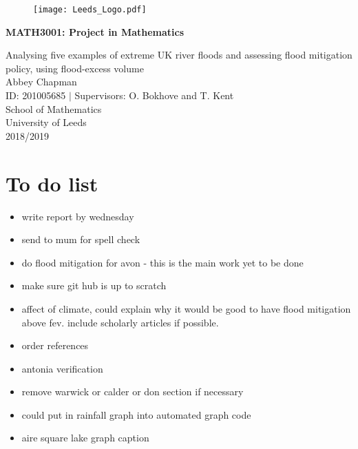 \documentclass[11pt,a4paper]{article}
\begin{document}

\begin{titlepage}
\begin{center}

\begin{figure}[t]
\raggedleft
\texttt{[image: Leeds\_Logo.pdf]}
\end{figure}
 

\vspace*{5cm}
{\huge \textbf{MATH3001: Project in Mathematics}}\\
\hrulefill

\vspace*{0.1cm}
{\LARGE Analysing five examples of extreme UK river floods and assessing flood mitigation policy, using flood-excess volume}\\
\vspace{1cm}
{\large Abbey Chapman}\\
{\large ID: 201005685 $|$ Supervisors: O. Bokhove and T. Kent}\\
\vfill
School of Mathematics\\
University of Leeds\\
2018/2019
\end{center}
\end{titlepage}

\tableofcontents 
\noindent \hrulefill

\newpage
\section{To do list}
\begin{itemize}
\item write report by wednesday
\item send to mum for spell check
\item do flood mitigation for avon - this is the main work yet to be done
\item make sure git hub is up to scratch
\item affect of climate, could explain why it would be good to have flood mitigation above fev. include scholarly articles if possible.
\item order references
\item antonia verification
\item remove warwick or calder or don section if necessary
\item could put in rainfall graph into automated graph code 
\item aire square lake graph caption
\end{itemize}
\end{document}
